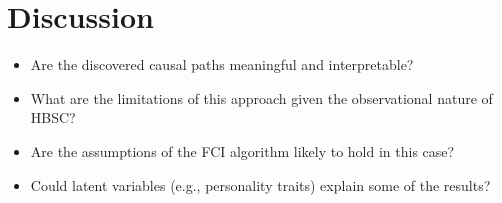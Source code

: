 \section{Discussion}

\begin{itemize}
    \item Are the discovered causal paths meaningful and interpretable?
    \item What are the limitations of this approach given the observational nature of HBSC?
    \item Are the assumptions of the FCI algorithm likely to hold in this case?
    \item Could latent variables (e.g., personality traits) explain some of the results?
\end{itemize}
